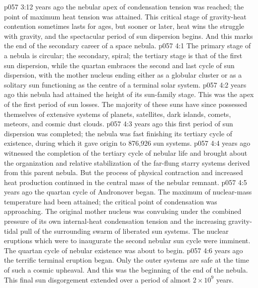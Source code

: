\vs p057 3:12 \pc {} years ago the nebular apex of condensation tension was reached; the point of maximum heat tension was attained. This critical stage of gravity\hyp{}heat contention sometimes lasts for ages, but sooner or later, heat wins the struggle with gravity, and the spectacular period of sun dispersion begins. And this marks the end of the secondary career of a space nebula.
\vs p057 4:1 The primary stage of a nebula is circular; the secondary, spiral; the tertiary stage is that of the first sun dispersion, while the quartan embraces the second and last cycle of sun dispersion, with the mother nucleus ending either as a globular cluster or as a solitary sun functioning as the centre of a terminal solar system.
\vs p057 4:2 \pc {} years ago this nebula had attained the height of its sun\hyp{}family stage. This was the apex of the first period of sun losses. The majority of these suns have since possessed themselves of extensive systems of planets, satellites, dark islands, comets, meteors, and cosmic dust clouds.
\vs p057 4:3 \pc {} years ago this first period of sun dispersion was completed; the nebula was fast finishing its tertiary cycle of existence, during which it gave origin to 876,926 sun systems.
\vs p057 4:4 \pc {} years ago witnessed the completion of the tertiary cycle of nebular life and brought about the organization and relative stabilization of the far\hyp{}flung starry systems derived from this parent nebula. But the process of physical contraction and increased heat production continued in the central mass of the nebular remnant.
\vs p057 4:5 \pc {} years ago the quartan cycle of Andronover began. The maximum of nuclear\hyp{}mass temperature had been attained; the critical point of condensation was approaching. The original mother nucleus was convulsing under the combined pressure of its own internal\hyp{}heat condensation tension and the increasing gravity\hyp{}tidal pull of the surrounding swarm of liberated sun systems. The nuclear eruptions which were to inaugurate the second nebular sun cycle were imminent. The quartan cycle of nebular existence was about to begin.
\vs p057 4:6 \pc {} years ago the terrific terminal eruption began. Only the outer systems are safe at the time of such a cosmic upheaval. And this was the beginning of the end of the nebula. This final sun disgorgement extended over a period of almost $2 \times 10^9$ years.
